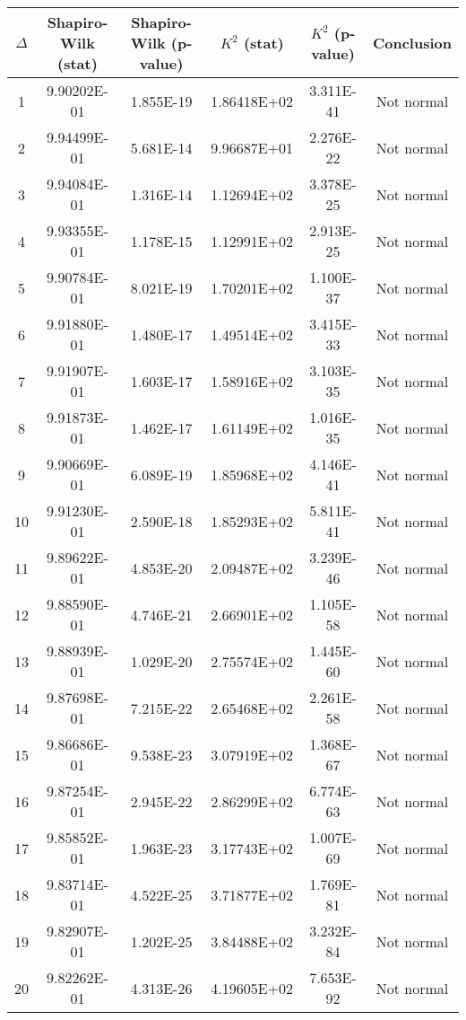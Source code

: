 \begin{table}[h]
	\begin{tabular}{|c|c|c|c|c|c|}
		\hline
		$\Delta$ &  Shapiro-Wilk (stat) & Shapiro-Wilk (p-value) & $K^2$ (stat) & $K^2$ (p-value) & Conclusion\\\hline
		\hline
		1 & 9.90202E-01 & 1.855E-19 & 1.86418E+02 & 3.311E-41 & Not normal\\\hline
		2 & 9.94499E-01 & 5.681E-14 & 9.96687E+01 & 2.276E-22 & Not normal\\\hline
		3 & 9.94084E-01 & 1.316E-14 & 1.12694E+02 & 3.378E-25 & Not normal\\\hline
		4 & 9.93355E-01 & 1.178E-15 & 1.12991E+02 & 2.913E-25 & Not normal\\\hline
		5 & 9.90784E-01 & 8.021E-19 & 1.70201E+02 & 1.100E-37 & Not normal\\\hline
		6 & 9.91880E-01 & 1.480E-17 & 1.49514E+02 & 3.415E-33 & Not normal\\\hline
		7 & 9.91907E-01 & 1.603E-17 & 1.58916E+02 & 3.103E-35 & Not normal\\\hline
		8 & 9.91873E-01 & 1.462E-17 & 1.61149E+02 & 1.016E-35 & Not normal\\\hline
		9 & 9.90669E-01 & 6.089E-19 & 1.85968E+02 & 4.146E-41 & Not normal\\\hline
		10 & 9.91230E-01 & 2.590E-18 & 1.85293E+02 & 5.811E-41 & Not normal\\\hline
		11 & 9.89622E-01 & 4.853E-20 & 2.09487E+02 & 3.239E-46 & Not normal\\\hline
		12 & 9.88590E-01 & 4.746E-21 & 2.66901E+02 & 1.105E-58 & Not normal\\\hline
		13 & 9.88939E-01 & 1.029E-20 & 2.75574E+02 & 1.445E-60 & Not normal\\\hline
		14 & 9.87698E-01 & 7.215E-22 & 2.65468E+02 & 2.261E-58 & Not normal\\\hline
		15 & 9.86686E-01 & 9.538E-23 & 3.07919E+02 & 1.368E-67 & Not normal\\\hline
		16 & 9.87254E-01 & 2.945E-22 & 2.86299E+02 & 6.774E-63 & Not normal\\\hline
		17 & 9.85852E-01 & 1.963E-23 & 3.17743E+02 & 1.007E-69 & Not normal\\\hline
		18 & 9.83714E-01 & 4.522E-25 & 3.71877E+02 & 1.769E-81 & Not normal\\\hline
		19 & 9.82907E-01 & 1.202E-25 & 3.84488E+02 & 3.232E-84 & Not normal\\\hline
		20 & 9.82262E-01 & 4.313E-26 & 4.19605E+02 & 7.653E-92 & Not normal\\\hline

\end{tabular}
\end{table}
